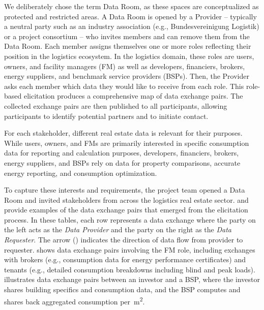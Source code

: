 We deliberately chose the term Data Room, as these spaces are conceptualized as protected and restricted areas. A Data Room is opened by a Provider -- typically a neutral party such as an industry association (e.g., Bundesvereinigung Logistik) or a project consortium -- who invites members and can remove them from the Data Room. Each member assigns themselves one or more roles reflecting their position in the logistics ecosystem.
In the logistics domain, these roles are users, owners, and facility managers (FM) as well as developers, financiers, brokers, energy suppliers, and benchmark service providers (BSPs).
Then, the Provider asks each member which data they would like to receive from each role. This role-based elicitation produces a comprehensive map of data exchange pairs. The collected exchange pairs are then published to all participants, allowing participants to identify potential partners and to initiate contact.


For each stakeholder, different real estate data is relevant for their purposes.
While users, owners, and FMs are primarily interested in specific consumption data for reporting and calculation purposes, developers, financiers, brokers, energy suppliers, and BSPs rely on data for property comparisons, accurate energy reporting, and consumption optimization.

To capture these interests and requirements, the project team opened a Data Room and invited stakeholders from across the logistics real estate sector.
 and  provide examples of the data exchange pairs that emerged from the elicitation process. In these tables, each row represents a data exchange where the party on the left acts as the \emph{Data Provider} and the party on the right as the \emph{Data Requester}. The arrow (\textrightarrow{}) indicates the direction of data flow from provider to requester.
 shows data exchange pairs involving the FM role, including exchanges with brokers (e.g., consumption data for energy performance certificates) and tenants (e.g., detailed consumption breakdowns including blind and peak loads).  illustrates data exchange pairs between an investor and a BSP, where the investor shares building specifics and consumption data, and the BSP computes and shares back aggregated consumption per~m\textsuperscript{2}.

